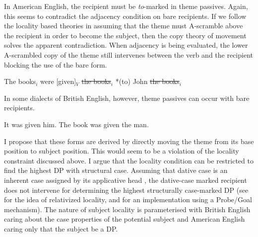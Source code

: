 In American English, the recipient must be \textit{to}-marked in theme passives. Again, this seems to contradict the adjacency condition on bare recipients. If we follow the locality based theories in assuming that the theme must A-scramble above the recipient in order to become the subject, then the copy theory of movement solves the apparent contradiction. When adjacency is being evaluated, the lower A-scrambled copy of the theme still intervenes between the verb and the recipient blocking the use of the bare form.
\begin{exe}
\ex The books$_{i}$ were [given]$_{V}$ \sout{the books}$_{i}$ *(to) John \sout{the books}$_{i}$
\end{exe}%
In some dialects of British English, however, theme passives can occur with bare recipients. 
\begin{exe}
\ex 
\begin{xlist}
\ex It was given him.
\ex The book was given the man.
\end{xlist}
\end{exe}%
I propose that these forms are derived by directly moving the theme from its base position to subject position. This would seem to be a violation of the locality constraint discussed above. I argue that the locality condition can be restricted to find the highest DP with structural case. Assuming that dative case is an inherent case assigned by its applicative head \citep{Woolford.2006}, the dative-case marked recipient does not intervene for determining the highest structurally case-marked DP (see \cite{Rizzi.1990} for the idea of relativized locality, and \cite{Chomsky.2001} for an implementation using a Probe/Goal mechanism). The nature of subject locality is parameterised with British English caring about the case properties of the potential subject and American English caring only that the subject be a DP. \begin{exe}
\ex \hfill \break
{}
\end{exe}
